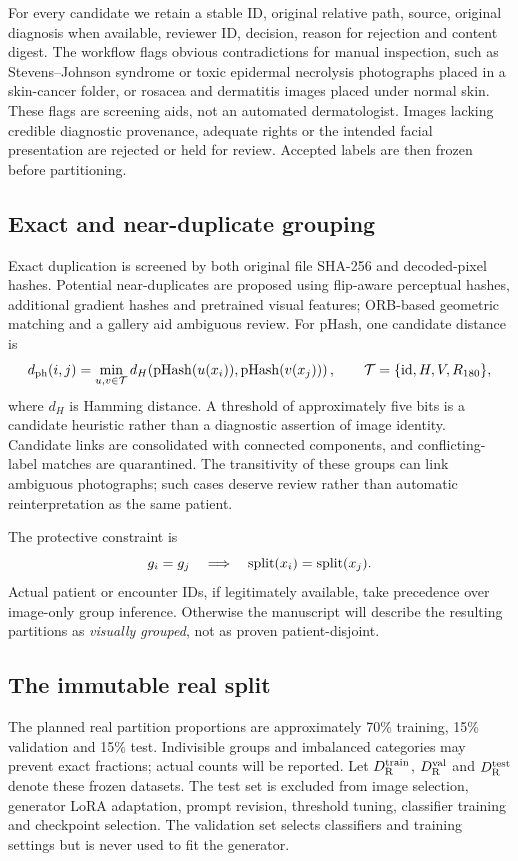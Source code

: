 For every candidate we retain a stable ID, original relative path, source, original diagnosis when available, reviewer ID, decision, reason for rejection and content digest. The workflow flags obvious contradictions for manual inspection, such as Stevens--Johnson syndrome or toxic epidermal necrolysis photographs placed in a skin-cancer folder, or rosacea and dermatitis images placed under normal skin. These flags are screening aids, not an automated dermatologist. Images lacking credible diagnostic provenance, adequate rights or the intended facial presentation are rejected or held for review. Accepted labels are then frozen before partitioning.

\subsection{Exact and near-duplicate grouping}
Exact duplication is screened by both original file SHA-256 and decoded-pixel hashes. Potential near-duplicates are proposed using flip-aware perceptual hashes, additional gradient hashes and pretrained visual features; ORB-based geometric matching and a gallery aid ambiguous review. For pHash, one candidate distance is
\begin{equation}
d_{\rm ph}(i,j)=\min_{u,v\in \mathcal{T}}
d_H\!\left({\rm pHash}(u(x_i)),{\rm pHash}(v(x_j))\right),
\qquad
\mathcal{T}=\{{\rm id},H,V,R_{180}\},
\label{eq:phash}
\end{equation}
where $d_H$ is Hamming distance. A threshold of approximately five bits is a candidate heuristic rather than a diagnostic assertion of image identity. Candidate links are consolidated with connected components, and conflicting-label matches are quarantined. The transitivity of these groups can link ambiguous photographs; such cases deserve review rather than automatic reinterpretation as the same patient.

The protective constraint is
\begin{equation}
g_i=g_j\quad\Longrightarrow\quad
{\rm split}(x_i)={\rm split}(x_j).
\label{eq:group}
\end{equation}
Actual patient or encounter IDs, if legitimately available, take precedence over image-only group inference. Otherwise the manuscript will describe the resulting partitions as \emph{visually grouped}, not as proven patient-disjoint.

\subsection{The immutable real split}
The planned real partition proportions are approximately 70\% training, 15\% validation and 15\% test. Indivisible groups and imbalanced categories may prevent exact fractions; actual counts will be reported. Let $D_{\mathrm{R}}^{\mathrm{train}}$, $D_{\mathrm{R}}^{\mathrm{val}}$ and $D_{\mathrm{R}}^{\mathrm{test}}$ denote these frozen datasets. The test set is excluded from image selection, generator LoRA adaptation, prompt revision, threshold tuning, classifier training and checkpoint selection. The validation set selects classifiers and training settings but is never used to fit the generator.

